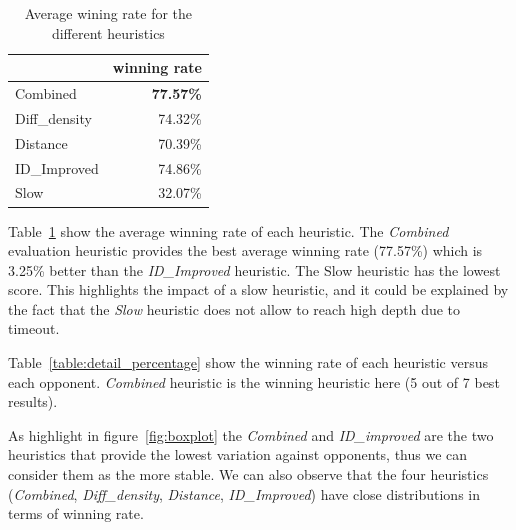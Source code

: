 \documentclass{article}
\begin{document}
\begin{table}
    \centering
\begin{tabular}{lr}
\toprule
{} &           winning rate \\
\midrule
    Combined     &   \bf{77.57}\% \\
    Diff\_density &    74.32\% \\
    Distance     &   70.39\% \\
    ID\_Improved &     74.86\% \\
    Slow         &   32.07\% \\
\bottomrule
\end{tabular}
    \caption{Average wining rate for the different heuristics \label{table:percentage}}
\end{table}
\clearpage

Table~\ref{table:percentage} show the average winning rate of each heuristic. The \emph{Combined} evaluation heuristic provides the best average winning rate (77.57\%) which is 3.25\% better than the \emph{ID\_Improved} heuristic. The Slow heuristic has the lowest score. This highlights the impact of a slow heuristic, and it could be explained by the fact that the \emph{Slow} heuristic does not allow to reach high depth due to timeout.


Table~\ref{table:detail_percentage} show the winning rate of each heuristic versus each opponent. \emph{Combined} heuristic is the winning heuristic here (5 out of 7 best results). 

As highlight in figure~\ref{fig:boxplot} the \emph{Combined} and \emph{ID\_improved} are the two heuristics that provide the lowest variation against opponents, thus we can consider them as the more stable. We can also observe that the four heuristics (\emph{Combined}, \emph{Diff\_density}, \emph{Distance}, \emph{ID\_Improved}) have close distributions in terms of winning rate.
\end{document}
